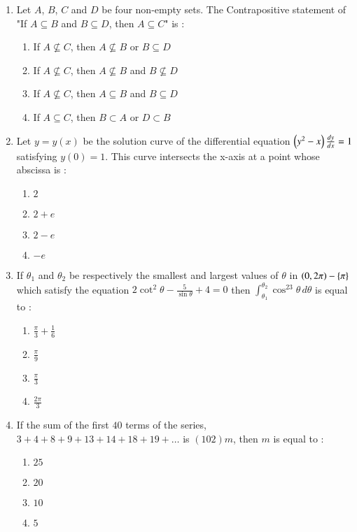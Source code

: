 \documentclass[journal,12pt,twocolumn]{IEEEtran}
\theoremstyle{remark}
\begin{document}
\begin{enumerate}
    \item Let $A$, $B$, $C$ and $D$ be four non-empty sets. The Contrapositive statement of "If $A \subseteq B$ and $B \subseteq D$, then $A \subseteq C$" is :
        \begin{enumerate}
            \item If $A \nsubseteq C$, then $A \nsubseteq B$ or $B \subseteq D$
            \item If $A \nsubseteq C$, then $A \nsubseteq B$ and $B \nsubseteq D$
            \item If $A \nsubseteq C$, then $A \subseteq B$ and $B \subseteq D$
            \item If $A \subseteq C$, then $B \subset A$ or $D \subset B$
        \end{enumerate}

    \item Let $y=y(x)$ be the solution curve of the differential equation $\left(y^2-x\right)\frac{dy}{dx}=1$ satisfying $y(0)=1$. This curve intersects the x-axis at a point whose abscissa is :
        \begin{enumerate}
            \item $2$
            \item $2+e$
            \item $2-e$
            \item $-e$
        \end{enumerate}

    \item If $\theta_1$ and $\theta_2$ be respectively the smallest and largest values of $\theta$ in $\left(0,2\pi\right)-\left\{\pi\right\}$ which satisfy the equation $2\cot^2\theta-\frac{5}{\sin\theta}+4=0$ then $\int_{\theta_1}^{\theta_2}\cos^23\theta\,d\theta$ is equal to :
        \begin{enumerate}
            \item $\frac{\pi}{3}+\frac{1}{6}$
            \item $\frac{\pi}{9}$
            \item $\frac{\pi}{3}$
            \item $\frac{2\pi}{3}$
        \end{enumerate}

    \item If the sum of the first $40$ terms of the series, $3+4+8+9+13+14+18+19+\dots$ is $(102)m$, then $m$ is equal to :
        \begin{enumerate}
            \item $25$
            \item $20$
            \item $10$
            \item $5$
        \end{enumerate}


\end{enumerate}
\end{document}
